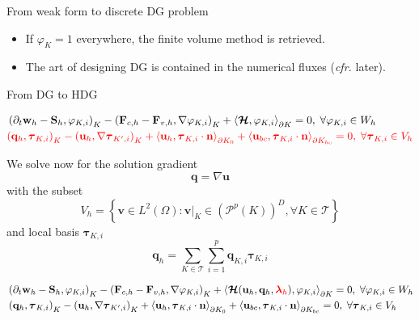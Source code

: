 \documentclass[24pt,t,table, aspectratio=169]{beamer}
\newcommand{\vecu}{\mathbf{u}}
\newcommand{\vecF}{\mathbf{F}}
\newcommand{\vecS}{\mathbf{S}}
\newcommand{\vecq}{\mathbf{q}}
\newcommand{\vecw}{\mathbf{w}}
\newcommand{\vectau}{\boldsymbol{\tau}}
\newcommand{\vecHcal}{\boldsymbol{\mathcal{H}}}
\newcommand{\veclambda}{\boldsymbol{\lambda}}
\newcommand{\tesselation}{\mathcal{T}}
\newcommand{\vecn}{\mathbf{n}}
\newcommand{\vecv}{\mathbf{v}}
\begin{document}
\begin{frame}{From weak form to discrete DG problem}
{\begin{itemize}
\item If $\varphi_K = 1$ everywhere, the finite volume method is retrieved.

\item The art of designing DG is contained in the numerical fluxes (\textit{cfr.} later).
\end{itemize}
}

\end{frame}

\begin{frame}{From DG to HDG}

{
\begin{equation*}
\begin{aligned}
& \left(\partial_t \vecw_{h} - \vecS_{h}, \varphi_{K,i} \right)_{K} - \left(\vecF_{c, {h}} - \vecF_{v, {h}}, \nabla \varphi_{K,i} \right)_{K} + \left\langle \vecHcal, \varphi_{K,i} \right\rangle_{\partial K} = 0, \; \forall \varphi_{K,i} \in W_h\\
& \textcolor{red}{\left(\vecq_h, \vectau_{K,i}\right)_{K} - \left(\vecu_h, \nabla \vectau_{K',i}\right)_{K} + \left\langle \vecu_h, \vectau_{K,i} \cdot \vecn \right\rangle_{\partial K_0} + \left\langle \vecu_{bc}, \vectau_{K,i} \cdot \vecn \right\rangle_{\partial K_{bc}} = 0,\; \forall \vectau_{K,i} \in V_h}
\end{aligned}
\end{equation*}

We solve now for the solution gradient
\begin{equation*}
\vecq = \nabla \vecu
\end{equation*}
with the subset
\begin{equation*}
V_h = \left\{\vecv \in L^2(\Omega) : \vecv|_K \in \left(\mathcal{P}^p(K)\right)^D, \forall K\in \tesselation\right\}
\end{equation*}
and local basis $\vectau_{K,i}$
\begin{equation*}
\vecq_h = \sum_{K\in\mathcal{T}}\sum_{i=1}^{p} \vecq_{K,i} \vectau_{K,i}
\end{equation*}

}

{
\begin{equation*}
\begin{aligned}
& \left(\partial_t \vecw_{h} - \vecS_{h}, \varphi_{K,i} \right)_{K} - \left(\vecF_{c, {h}} - \vecF_{v, {h}}, \nabla \varphi_{K,i} \right)_{K} + \left\langle \vecHcal(\vecu_h, \vecq_h, \textcolor{red}{\veclambda_h}), \varphi_{K,i} \right\rangle_{\partial K} = 0, \; \forall \varphi_{K,i} \in W_h\\
& \left(\vecq_h, \vectau_{K,i}\right)_{K} - \left(\vecu_h, \nabla \vectau_{K',i}\right)_{K} + \left\langle \vecu_h, \vectau_{K,i} \cdot \vecn \right\rangle_{\partial K_0} + \left\langle \vecu_{bc}, \vectau_{K,i} \cdot \vecn \right\rangle_{\partial K_{bc}} = 0,\; \forall \vectau_{K,i} \in V_h
\end{aligned}
\end{equation*}

}
\end{frame}
\end{document}
